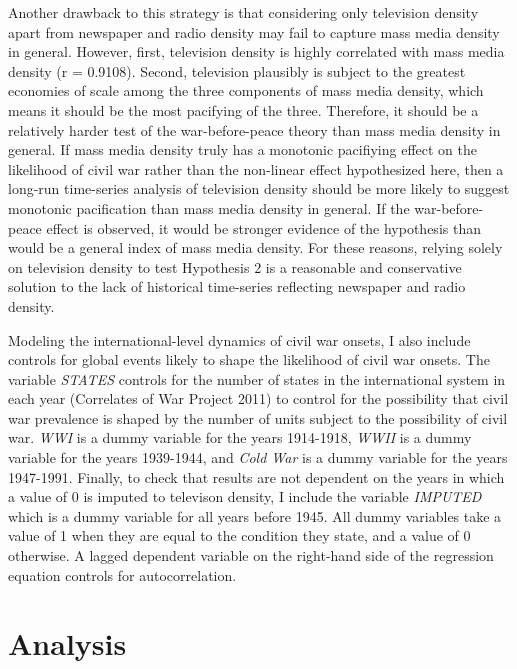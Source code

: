 \documentclass[12pt,article,oneside]{memoir}
\begin{document}
Another drawback to this strategy is that considering only television
density apart from newspaper and radio density may fail to capture mass
media density in general. However, first, television density is highly
correlated with mass media density (r = 0.9108). Second, television
plausibly is subject to the greatest economies of scale among the three
components of mass media density, which means it should be the most
pacifying of the three. Therefore, it should be a relatively harder test
of the war-before-peace theory than mass media density in general. If
mass media density truly has a monotonic pacifiying effect on the
likelihood of civil war rather than the non-linear effect hypothesized
here, then a long-run time-series analysis of television density should
be more likely to suggest monotonic pacification than mass media density
in general. If the war-before-peace effect is observed, it would be
stronger evidence of the hypothesis than would be a general index of
mass media density. For these reasons, relying solely on television
density to test Hypothesis 2 is a reasonable and conservative solution
to the lack of historical time-series reflecting newspaper and radio
density.

Modeling the international-level dynamics of civil war onsets, I also
include controls for global events likely to shape the likelihood of
civil war onsets. The variable \emph{STATES} controls for the number of
states in the international system in each year (Correlates of War
Project 2011) to control for the possibility that civil war prevalence
is shaped by the number of units subject to the possibility of civil
war. \emph{WWI} is a dummy variable for the years 1914-1918, \emph{WWII}
is a dummy variable for the years 1939-1944, and \emph{Cold War} is a
dummy variable for the years 1947-1991. Finally, to check that results
are not dependent on the years in which a value of 0 is imputed to
televison density, I include the variable \emph{IMPUTED} which is a
dummy variable for all years before 1945. All dummy variables take a
value of 1 when they are equal to the condition they state, and a value
of 0 otherwise. A lagged dependent variable on the right-hand side of
the regression equation controls for autocorrelation.

\section{Analysis}\label{analysis}
\end{document}
